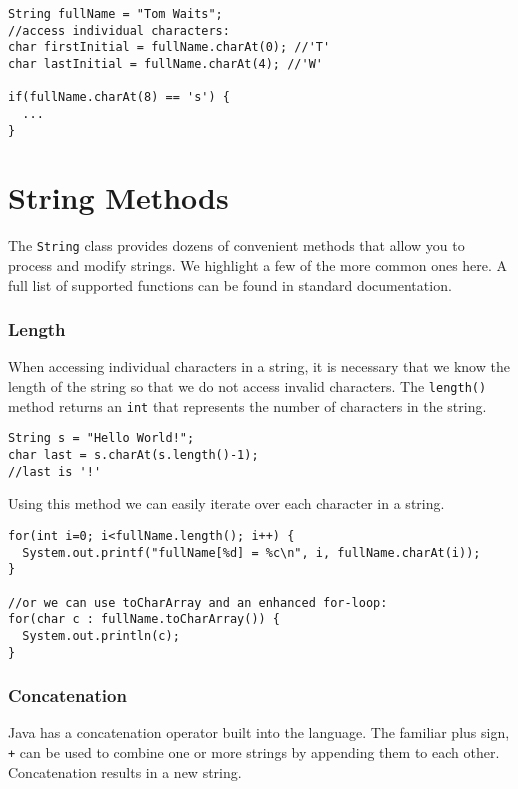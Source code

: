 \begin{verbatim}
String fullName = "Tom Waits";
//access individual characters:
char firstInitial = fullName.charAt(0); //'T'
char lastInitial = fullName.charAt(4); //'W'

if(fullName.charAt(8) == 's') {
  ...
}
\end{verbatim}

\section{String Methods}

The \texttt{String} class provides dozens of 
convenient methods that allow you to process and modify strings.
We highlight a few of the more common ones here.  A full
list of supported functions can be found in standard 
documentation.

\subsubsection{Length}

When accessing individual characters in a string, it
is necessary that we know the length of the string so
that we do not access invalid characters.  The 
\texttt{length()} method returns an \texttt{int}
that represents the number of characters in the
string.  

\begin{verbatim}
String s = "Hello World!";
char last = s.charAt(s.length()-1);
//last is '!'
\end{verbatim}

Using this method we can easily iterate over each 
character in a string.

\begin{verbatim}
for(int i=0; i<fullName.length(); i++) {
  System.out.printf("fullName[%d] = %c\n", i, fullName.charAt(i));
}

//or we can use toCharArray and an enhanced for-loop:
for(char c : fullName.toCharArray()) {
  System.out.println(c);
}
\end{verbatim}

\subsubsection{Concatenation}

Java has a concatenation operator built into the language.
The familiar plus sign, \texttt{+} can be used
to combine one or more strings by appending them to each
other.  Concatenation results in a new string.

